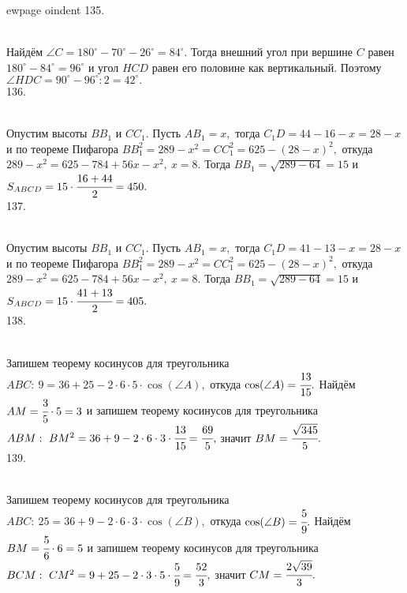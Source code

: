 ewpage
oindent
135. \begin{figure}[ht!]
\end{figure}\\
Найдём $\angle C=180^\circ-70^\circ-26^\circ=84^\circ.$ Тогда внешний угол при вершине $C$ равен $180^\circ-84^\circ=96^\circ$ и угол $HCD$ равен его половине как вертикальный. Поэтому $\angle HDC=90^\circ-96^\circ:2=42^\circ.$\\
136. \begin{figure}[ht!]
\end{figure}\\
Опустим высоты $BB_1$ и $CC_1.$ Пусть $AB_1=x,$ тогда $C_1D=44-16-x=28-x$ и по теореме Пифагора $BB_1^2=289-x^2=CC_1^2=625-(28-x)^2,$ откуда
$289-x^2=625-784+56x-x^2,\ x=8.$ Тогда $BB_1=\sqrt{289-64}=15$ и $S_{ABCD}=15\cdot\cfrac{16+44}{2}=450.$\\
137. \begin{figure}[ht!]
\end{figure}\\
Опустим высоты $BB_1$ и $CC_1.$ Пусть $AB_1=x,$ тогда $C_1D=41-13-x=28-x$ и по теореме Пифагора $BB_1^2=289-x^2=CC_1^2=625-(28-x)^2,$ откуда
$289-x^2=625-784+56x-x^2,\ x=8.$ Тогда $BB_1=\sqrt{289-64}=15$ и $S_{ABCD}=15\cdot\cfrac{41+13}{2}=405.$\\
138. \begin{figure}[ht!]
\end{figure}\\
Запишем теорему косинусов для треугольника $ABC:\ 9=36+25-2\cdot6\cdot5\cdot\cos(\angle A),$ откуда $\cos(\angle A)=\cfrac{13}{15}.$ Найдём $AM=\cfrac{3}{5}\cdot5=3$ и запишем теорему косинусов для треугольника $ABM:\ BM^2=36+9-2\cdot6\cdot3\cdot\cfrac{13}{15}=\cfrac{69}{5},$ значит $BM=\cfrac{\sqrt{345}}{5}.$\\
139. \begin{figure}[ht!]
\end{figure}\\
Запишем теорему косинусов для треугольника $ABC:\ 25=36+9-2\cdot6\cdot3\cdot\cos(\angle B),$ откуда $\cos(\angle B)=\cfrac{5}{9}.$ Найдём $BM=\cfrac{5}{6}\cdot6=5$ и запишем теорему косинусов для треугольника $BCM:\ CM^2=9+25-2\cdot3\cdot5\cdot\cfrac{5}{9}=\cfrac{52}{3},$ значит $CM=\cfrac{2\sqrt{39}}{3}.$\\

